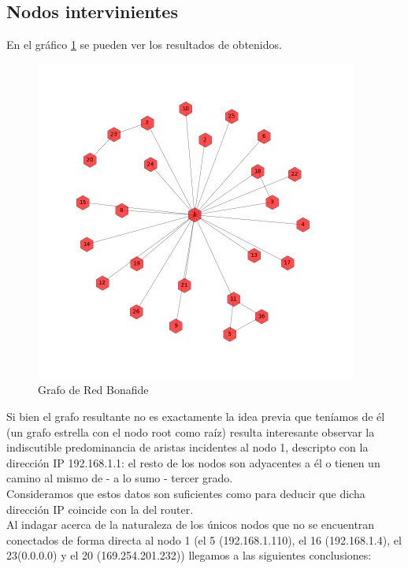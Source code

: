 \subsection{Nodos intervinientes}

En el gráfico \ref{bonafide:graph} se pueden ver los resultados de obtenidos.

\begin{figure}[h!]
    \centering                                                       
    \includegraphics[width=300pt]{img/bonafideGraph.png}
    \caption{Grafo de Red Bonafide}
    \label{bonafide:graph}
\end{figure}
Si bien el grafo resultante no es exactamente la idea previa que teníamos de él (un grafo estrella con el nodo root como raíz) resulta interesante observar la indiscutible predominancia de aristas incidentes al nodo 1, descripto con la dirección IP 192.168.1.1: el resto de los nodos son adyacentes a él o tienen un camino al mismo de - a lo sumo - tercer grado.\\
Consideramos que estos datos son suficientes como para deducir que dicha dirección IP coincide con la del router.\\
Al indagar acerca de la naturaleza de los únicos nodos que no se encuentran conectados de forma directa al nodo 1 (el 5 (192.168.1.110), el 16 (192.168.1.4), el 23(0.0.0.0) y el 20 (169.254.201.232)) llegamos a las siguientes conclusiones: \\

